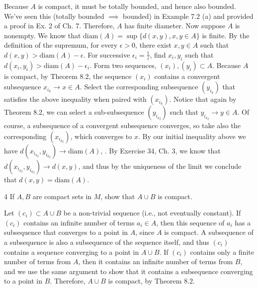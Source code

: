 \begin{solution}
    
    Because $A$ is compact, it must be totally bounded, and hence also bounded.
    We've seen this (totally bounded $\implies$ bounded) in Example 7.2 (a) and provided a proof in Ex. 2 of Ch. 7.
    Therefore, $A$ has finite diameter.
    Now suppose $A$ is nonempty.
    We know that $\text{diam}(A) = \sup\{d(x, y), x, y \in A\}$ is finite.
    By the definition of the supremum, for every $\epsilon > 0$, there exist $x, y \in A$ such that $d(x, y) > \text{diam}(A) - \epsilon$.
    For successive $\epsilon_i = \frac{1}{i}$, find $x_i, y_i$ such that $d(x_i, y_i) > \text{diam}(A) - \epsilon_i$.
    Form two sequences, $(x_i), (y_i) \subset A$.
    Because $A$ is compact, by Theorem 8.2, the sequence $(x_i)$ contains a convergent subsequence $x_{i_k} \rightarrow x \in A$.
    Select the corresponding subsequence $(y_{i_k})$ that satisfies the above inequality when paired with $(x_{i_k})$.
    Notice that again by Theorem 8.2, we can select a sub-subsequence $(y_{{i_k}_{l}})$ such that $y_{{i_k}_l} \rightarrow y \in A$.
    Of course, a subsequence of a convergent subsequence converges, so take also the corresponding $(x_{{i_k}_l})$, which converges to $x$.
    By our initial inequality above we have $d(x_{{i_k}_l}, y_{{i_k}_l}) \rightarrow \text{diam}(A)$, .
    By Exercise 34, Ch. 3, we know that $d(x_{{i_k}_l}, y_{{i_k}_l}) \rightarrow d(x, y)$, and thus by the uniqueness of the limit we conclude that $d(x, y) = \text{diam}(A)$.
\end{solution}

\begin{exercise}{4}
    If $A, B$ are compact sets in $M$, show that $A \cup B$ is compact.
\end{exercise}

\begin{solution}
    
    Let $(c_i) \subset A \cup B$ be a non-trivial sequence (i.e., not eventually constant).
    If $(c_i)$ contains an infinite number of terms $a_i \in A$, then this sequence of $a_i$ has a subsequence that converges to a point in $A$, since $A$ is compact.
    A subsequence of a subsequence is also a subsequence of the sequence itself, and thus $(c_i)$ contains a sequence converging to a point in $A \cup B$.
    If $(c_i)$ contains only a finite number of terms from $A$, then it contains an infinite number of terms from $B$, and we use the same argument to show that it contains a subsequence converging to a point in $B$.
    Therefore, $A \cup B$ is compact, by Theorem 8.2.
\end{solution}

